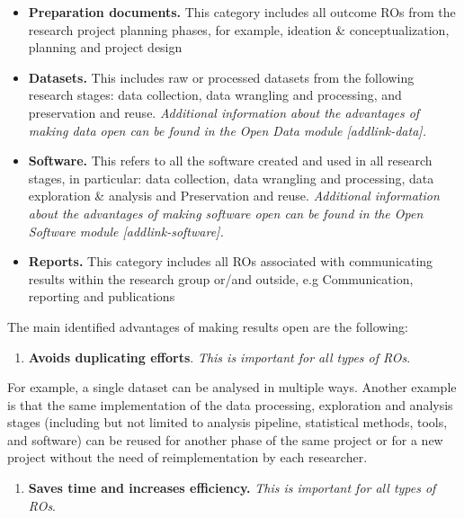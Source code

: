 \documentclass[
  letterpaper,
  DIV=11,
  numbers=noendperiod]{scrreport}
\providecommand{\tightlist}{%
  \setlength{\itemsep}{0pt}\setlength{\parskip}{0pt}}\usepackage{longtable,booktabs,array}
\begin{document}
\begin{itemize}
\tightlist
\item
  \textbf{Preparation documents.} This category includes all outcome ROs
  from the research project planning phases, for example, ideation \&
  conceptualization, planning and project design
\item
  \textbf{Datasets.} This includes raw or processed datasets from the
  following research stages: data collection, data wrangling and
  processing, and preservation and reuse. \emph{Additional information
  about the advantages of making data open can be found in the Open Data
  module {[}addlink-data{]}.}
\item
  \textbf{Software.} This refers to all the software created and used in
  all research stages, in particular: data collection, data wrangling
  and processing, data exploration \& analysis and Preservation and
  reuse. \emph{Additional information about the advantages of making
  software open can be found in the Open Software module
  {[}addlink-software{]}.}
\item
  \textbf{Reports.} This category includes all ROs associated with
  communicating results within the research group or/and outside, e.g
  Communication, reporting and publications
\end{itemize}

The main identified advantages of making results open are the following:

\begin{enumerate}
\def\labelenumi{\arabic{enumi}.}
\tightlist
\item
  \textbf{Avoids duplicating efforts}.\hspace{0pt} \emph{This is
  important for all types of ROs}.
\end{enumerate}

For example, a single dataset can be analysed in multiple ways. Another
example is that the same implementation of the data processing,
exploration and analysis stages (including but not limited to analysis
pipeline, statistical methods, tools, and software) can be reused for
another phase of the same project or for a new project without the need
of reimplementation by each researcher.

\begin{enumerate}
\def\labelenumi{\arabic{enumi}.}
\tightlist
\item
  \textbf{Saves time and increases efficiency.} \emph{This is important
  for all types of ROs}.
\end{enumerate}
\end{document}
